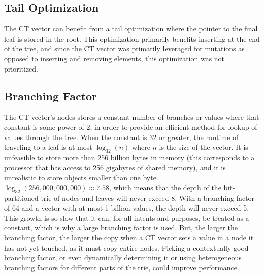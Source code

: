 \begin{comment}
TODO: move to implementation
\subsection{Redundant Storage in Nodes}
The size of the code could be reduced by a fairly
large constant factor of approximately $2$ for 32-bit values (such as
\texttt{int}s or \texttt{float}s on most platforms) and a depth of $5$, which
corresponds to a size of $64^5 \approx 1,000,000,000$ using the default branch
size of 64. This factor diminishes to $1.07$ for storing 1024-bit objects and
increases to $3.4$ for packed boolean values by using a \texttt{std::bitset}
instead of a \texttt{std::array} to store values, although this has not been
implemented. In space-sensitive applications where computations are usually
performed on 32-bit numbers, the space savings above do make a difference.
\end{comment}

\subsection{Tail Optimization}
The CT vector can benefit from a tail optimization where the pointer to
the final leaf is stored in the root. This optimization primarily benefits
inserting at the end of the tree, and since the CT vector was primarily
leveraged for mutations as opposed to inserting and removing elements, this
optimization was not prioritized.

\subsection{Branching Factor}
The CT vector's nodes stores a constant number of branches or values where that
constant is some power of 2, in order to provide an efficient method for lookup
of values through the tree. When the constant is 32 or greater, the runtime of
traveling to a leaf is at most $\log_{32}(n)$ where $n$ is the size of the
vector. It is unfeasible to store more than 256 billion bytes in memory (this
corresponds to a processor that has access to 256 gigabytes of shared memory),
and it is unrealistic to store objects smaller than one byte.
$\log_{32}(256,000,000,000) \approx 7.58$, which means that the depth of the
bit-partitioned trie of nodes and leaves will never exceed 8. With a branching
factor of 64 and a vector with at most 1 billion values, the depth will never
exceed 5. This growth is so slow that it can, for all intents and purposes, be
treated as a constant, which is why a large branching factor is used. But, the
larger the branching factor, the larger the copy when a CT vector sets a value
in a node it has not yet touched, as it must copy entire nodes. Picking a
contextually good branching factor, or even dynamically determining it or using
heterogeneous branching factors for different parts of the trie, could improve
performance.

